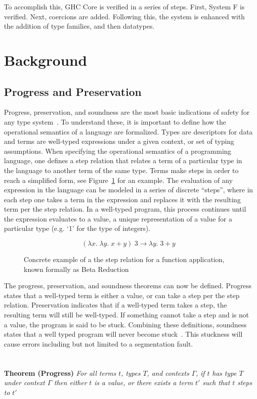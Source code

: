 \documentclass{sig-alternate}
\begin{document}
To accomplish this, GHC Core is verified in a series of steps. First, System F is verified. Next, coercions are added. Following this, the system is enhanced with the addition of type families, and then datatypes.

\section{Background}
\label{sec:background}
\subsection{Progress and Preservation}
Progress, preservation, and soundness are the most basic indications of safety for any type system~\cite{Pierce:TAPL}. To understand these, it is important to define how the operational semantics of a language are formalized. Types are descriptors for data and terms are well-typed expressions under a given context, or set of typing assumptions. When specifying the operational semantics of a programming language, one defines a step relation that relates a term of a particular type in the language to another term of the same type. Terms make steps in order to reach a simplified form, see Figure~\ref{fig:step-ex} for an example. The evaluation of any expression in the language can be modeled in a series of discrete ``steps'', where in each step one takes a term in the expression and replaces it with the resulting term per the step relation. In a well-typed program, this process continues until the expression evaluates to a value, a unique representation of a value for a particular type (e.g. `1' for the type of integers).

\begin{figure}
  $$(\lambda x .\; \lambda y .\;x+y)\; 3 \rightarrow \lambda y.\;3+y$$
  \caption{Concrete example of a the step relation for a function application, known formally as Beta Reduction}
  \label{fig:step-ex}
\end{figure}

The progress, preservation, and soundness theorems can now be defined. Progress states that a well-typed term is either a value, or can take a step per the step relation. Preservation indicates that if a well-typed term takes a step, the resulting term will still be well-typed. If something cannot take a step and is not a value, the program is said to be stuck. Combining these definitions, soundness states that a well typed program will never become stuck~\cite{Pierce:TAPL}. This stuckness will cause errors including but not limited to a segmentation fault. \\\\\\
\noindent\textbf{Theorem (Progress)} \textit{For all terms $t$, types $T$, and contexts $\Gamma$, if $t$ has type $T$ under context $\Gamma$ then either $t$ is a value, or there exists a term $t'$ such that $t$ steps to $t'$} \\
\end{document}
